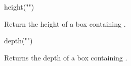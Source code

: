 \begin{math-function}{height("")}
\mathcommand

  Return the height of a box containing .

\begin{codeexample}[]
 \pgfmathresult
\end{codeexample}
\end{math-function}

\begin{math-function}{depth("")}
\mathcommand

  Returns the depth of a box containing .

\begin{codeexample}[]
 \pgfmathresult
\end{codeexample}
\end{math-function}
